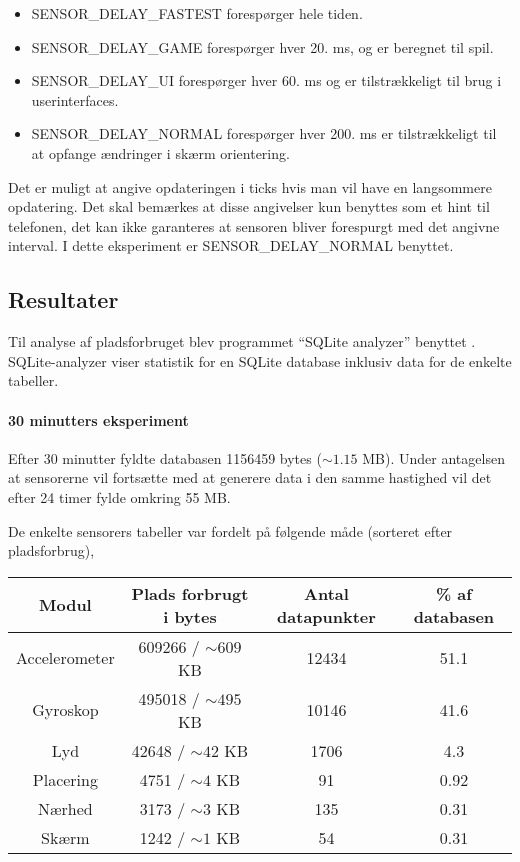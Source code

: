 \begin{itemize}
	\item SENSOR\_DELAY\_FASTEST forespørger hele tiden.
	\item SENSOR\_DELAY\_GAME forespørger hver 20. ms, og er beregnet til spil.
	\item SENSOR\_DELAY\_UI forespørger hver 60. ms og er tilstrækkeligt til brug i userinterfaces.
	\item SENSOR\_DELAY\_NORMAL forespørger hver 200. ms er tilstrækkeligt til at opfange ændringer i skærm orientering.
\end{itemize}
Det er muligt at angive opdateringen i ticks hvis man vil have en langsommere opdatering.
Det skal bemærkes at disse angivelser kun benyttes som et hint til telefonen, det kan ikke garanteres at sensoren bliver forespurgt med det angivne interval.
I dette eksperiment er SENSOR\_DELAY\_NORMAL benyttet.


\subsection{Resultater}
Til analyse af pladsforbruget blev programmet ``SQLite analyzer'' benyttet \cite{sqliteanalyzer}.
SQLite-analyzer viser statistik for en SQLite database inklusiv data for de enkelte tabeller.

\paragraph{30 minutters eksperiment}
Efter 30 minutter fyldte databasen 1156459 bytes ($\sim 1.15$ MB).
Under antagelsen at sensorerne vil fortsætte med at generere data i den samme hastighed vil det efter 24 timer fylde omkring 55 MB. 

De enkelte sensorers tabeller var fordelt på følgende måde (sorteret efter pladsforbrug),

\begin{tabular}{|c|c|c|c|}
	\hline Modul 			& Plads forbrugt i bytes	& Antal datapunkter  & \% af databasen \\
	\hline Accelerometer 	& 609266 / $\sim 609$ KB	& 12434 			 & 51.1 \\ 
	\hline Gyroskop 		& 495018 / $\sim 495$ KB	& 10146 			 & 41.6\\ 
	\hline Lyd 				& 42648  / $\sim 42$ KB		& 1706 			 	 & 4.3 \\ 
	\hline Placering 		& 4751 	 / $\sim 4$ KB		& 91 				 & 0.92 \\ 
	\hline Nærhed    		& 3173 	 / $\sim 3$ KB		& 135 				 & 0.31 \\ 
	\hline Skærm 			& 1242 	 / $\sim 1$	KB		& 54				 & 0.31 \\ 
	\hline 
\end{tabular} 

